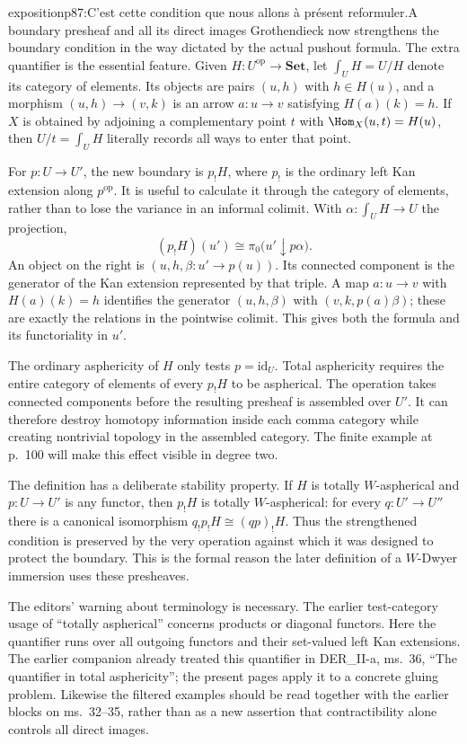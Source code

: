\begin{dcomment}{exposition}{p87:C’est cette condition que nous allons à présent reformuler.}{A boundary presheaf and all its direct images}
Grothendieck now strengthens the boundary condition in the way dictated by the actual pushout formula. The extra quantifier is the essential feature. Given $H:U^{\mathrm{op}}\to\mathbf{Set}$, let $\int_U H=U/H$ denote its category of elements. Its objects are pairs $(u,h)$ with $h\in H(u)$, and a morphism $(u,h)\to(v,k)$ is an arrow $a:u\to v$ satisfying $H(a)(k)=h$. If $X$ is obtained by adjoining a complementary point $t$ with $\Hom_X(u,t)=H(u)$, then $U/t=\int_U H$ literally records all ways to enter that point.

For $p:U\to U'$, the new boundary is $p_!H$, where $p_!$ is the ordinary left Kan extension along $p^{\mathrm{op}}$. It is useful to calculate it through the category of elements, rather than to lose the variance in an informal colimit. With $\alpha:\int_UH\to U$ the projection,
\[
(p_!H)(u')\cong\pi_0\bigl(u'\downarrow p\alpha\bigr).
\]
An object on the right is $(u,h,\beta:u'\to p(u))$. Its connected component is the generator of the Kan extension represented by that triple. A map $a:u\to v$ with $H(a)(k)=h$ identifies the generator $(u,h,\beta)$ with $(v,k,p(a)\beta)$; these are exactly the relations in the pointwise colimit. This gives both the formula and its functoriality in $u'$.

The ordinary asphericity of $H$ only tests $p=\mathrm{id}_U$. Total asphericity requires the entire category of elements of every $p_!H$ to be aspherical. The operation takes connected components before the resulting presheaf is assembled over $U'$. It can therefore destroy homotopy information inside each comma category while creating nontrivial topology in the assembled category. The finite example at p.~100 will make this effect visible in degree two.

The definition has a deliberate stability property. If $H$ is totally $W$-aspherical and $p:U\to U'$ is any functor, then $p_!H$ is totally $W$-aspherical: for every $q:U'\to U''$ there is a canonical isomorphism $q_!p_!H\cong(qp)_!H$. Thus the strengthened condition is preserved by the very operation against which it was designed to protect the boundary. This is the formal reason the later definition of a $W$-Dwyer immersion uses these presheaves.

The editors' warning about terminology is necessary. The earlier test-category usage of ``totally aspherical'' concerns products or diagonal functors. Here the quantifier runs over all outgoing functors and their set-valued left Kan extensions. The earlier companion already treated this quantifier in DER\_II-a, ms.~36, ``The quantifier in total asphericity''; the present pages apply it to a concrete gluing problem. Likewise the filtered examples should be read together with the earlier blocks on ms.~32--35, rather than as a new assertion that contractibility alone controls all direct images.
\end{dcomment}

